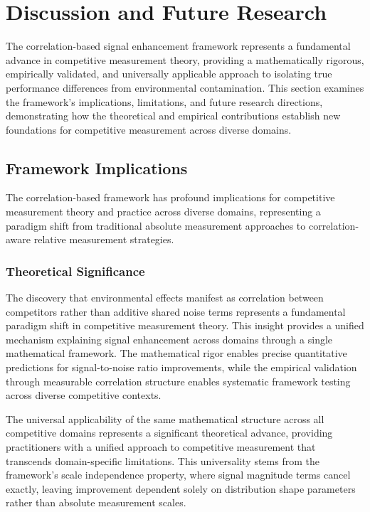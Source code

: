 \section{Discussion and Future Research}

The correlation-based signal enhancement framework represents a fundamental advance in competitive measurement theory, providing a mathematically rigorous, empirically validated, and universally applicable approach to isolating true performance differences from environmental contamination. This section examines the framework's implications, limitations, and future research directions, demonstrating how the theoretical and empirical contributions establish new foundations for competitive measurement across diverse domains.

\subsection{Framework Implications}

The correlation-based framework has profound implications for competitive measurement theory and practice across diverse domains, representing a paradigm shift from traditional absolute measurement approaches to correlation-aware relative measurement strategies.

\subsubsection{Theoretical Significance}

The discovery that environmental effects manifest as correlation between competitors rather than additive shared noise terms represents a fundamental paradigm shift in competitive measurement theory. This insight provides a unified mechanism explaining signal enhancement across domains through a single mathematical framework. The mathematical rigor enables precise quantitative predictions for signal-to-noise ratio improvements, while the empirical validation through measurable correlation structure enables systematic framework testing across diverse competitive contexts.

The universal applicability of the same mathematical structure across all competitive domains represents a significant theoretical advance, providing practitioners with a unified approach to competitive measurement that transcends domain-specific limitations. This universality stems from the framework's scale independence property, where signal magnitude terms cancel exactly, leaving improvement dependent solely on distribution shape parameters rather than absolute measurement scales.

